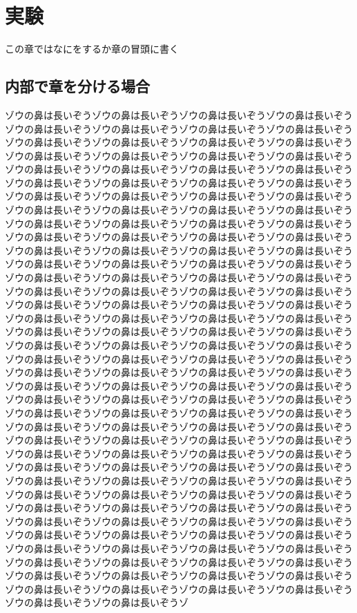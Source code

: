 \chapter{実験}
\label{Sec:experiment}

この章ではなにをするか章の冒頭に書く


\section{内部で章を分ける場合}\label{Sec:sub_experiment}

ゾウの鼻は長いぞうゾウの鼻は長いぞうゾウの鼻は長いぞうゾウの鼻は長いぞうゾウの鼻は長いぞうゾウの鼻は長いぞうゾウの鼻は長いぞうゾウの鼻は長いぞうゾウの鼻は長いぞうゾウの鼻は長いぞうゾウの鼻は長いぞうゾウの鼻は長いぞうゾウの鼻は長いぞうゾウの鼻は長いぞうゾウの鼻は長いぞうゾウの鼻は長いぞうゾウの鼻は長いぞうゾウの鼻は長いぞうゾウの鼻は長いぞうゾウの鼻は長いぞうゾウの鼻は長いぞうゾウの鼻は長いぞうゾウの鼻は長いぞうゾウの鼻は長いぞうゾウの鼻は長いぞうゾウの鼻は長いぞうゾウの鼻は長いぞうゾウの鼻は長いぞうゾウの鼻は長いぞうゾウの鼻は長いぞうゾウの鼻は長いぞうゾウの鼻は長いぞうゾウの鼻は長いぞうゾウの鼻は長いぞうゾウの鼻は長いぞうゾウの鼻は長いぞうゾウの鼻は長いぞうゾウの鼻は長いぞうゾウの鼻は長いぞうゾウの鼻は長いぞうゾウの鼻は長いぞうゾウの鼻は長いぞうゾウの鼻は長いぞうゾウの鼻は長いぞうゾウの鼻は長いぞうゾウの鼻は長いぞうゾウの鼻は長いぞうゾウの鼻は長いぞうゾウの鼻は長いぞうゾウの鼻は長いぞうゾウの鼻は長いぞうゾウの鼻は長いぞうゾウの鼻は長いぞうゾウの鼻は長いぞうゾウの鼻は長いぞうゾウの鼻は長いぞうゾウの鼻は長いぞうゾウの鼻は長いぞうゾウの鼻は長いぞうゾウの鼻は長いぞうゾウの鼻は長いぞうゾウの鼻は長いぞうゾウの鼻は長いぞうゾウの鼻は長いぞうゾウの鼻は長いぞうゾウの鼻は長いぞうゾウの鼻は長いぞうゾウの鼻は長いぞうゾウの鼻は長いぞうゾウの鼻は長いぞうゾウの鼻は長いぞうゾウの鼻は長いぞうゾウの鼻は長いぞうゾウの鼻は長いぞうゾウの鼻は長いぞうゾウの鼻は長いぞうゾウの鼻は長いぞうゾウの鼻は長いぞうゾウの鼻は長いぞうゾウの鼻は長いぞうゾウの鼻は長いぞうゾウの鼻は長いぞうゾウの鼻は長いぞうゾウの鼻は長いぞうゾウの鼻は長いぞうゾウの鼻は長いぞうゾウの鼻は長いぞうゾウの鼻は長いぞうゾウの鼻は長いぞうゾウの鼻は長いぞうゾウの鼻は長いぞうゾウの鼻は長いぞうゾウの鼻は長いぞうゾウの鼻は長いぞうゾウの鼻は長いぞうゾウの鼻は長いぞうゾウの鼻は長いぞうゾウの鼻は長いぞうゾウの鼻は長いぞうゾウの鼻は長いぞうゾウの鼻は長いぞうゾウの鼻は長いぞうゾウの鼻は長いぞうゾウの鼻は長いぞうゾウの鼻は長いぞうゾウの鼻は長いぞうゾウの鼻は長いぞうゾウの鼻は長いぞうゾウの鼻は長いぞうゾウの鼻は長いぞうゾウの鼻は長いぞうゾウの鼻は長いぞうゾウの鼻は長いぞうゾウの鼻は長いぞうゾウの鼻は長いぞうゾウの鼻は長いぞうゾウの鼻は長いぞうゾウの鼻は長いぞうゾウの鼻は長いぞうゾウの鼻は長いぞうゾウの鼻は長いぞうゾウの鼻は長いぞうゾウの鼻は長いぞうゾウの鼻は長いぞうゾウの鼻は長いぞうゾウの鼻は長いぞうゾウの鼻は長いぞうゾウの鼻は長いぞうゾウの鼻は長いぞうゾウの鼻は長いぞうゾウの鼻は長いぞうゾウの鼻は長いぞうゾウの鼻は長いぞうゾウの鼻は長いぞうゾウの鼻は長いぞうゾウの鼻は長いぞうゾウの鼻は長いぞうゾウの鼻は長いぞうゾウの鼻は長いぞうゾウの鼻は長いぞうゾウの鼻は長いぞうゾウの鼻は長いぞうゾウの鼻は長いぞうゾウの鼻は長いぞうゾウの鼻は長いぞうゾウの鼻は長いぞうゾ